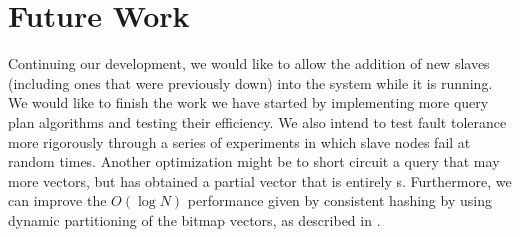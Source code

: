 \section{Future Work}
Continuing our development, we would like to allow the addition of new slaves
(including ones that were previously down) into the system while it is running.
We would like to finish the work we have started by implementing more
query plan algorithms and testing their efficiency. We also intend to test
fault tolerance more rigorously through a series of experiments in which
slave nodes fail at random times. Another optimization might be to short circuit
a query that may  more vectors, but has obtained a partial vector that
is entirely s. Furthermore, we can improve the $O(\log N)$ performance
given by consistent hashing by using dynamic partitioning of the bitmap
vectors, as described in \cite{kleppman2017}.

